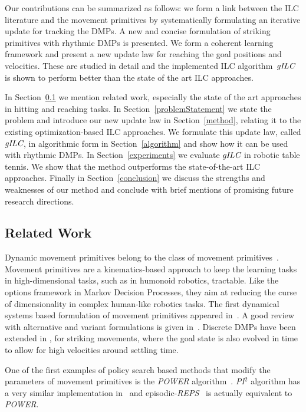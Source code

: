 Our contributions can be summarized as follows: we form a link between the ILC literature and the movement primitives by systematically formulating an iterative update for tracking the DMPs. A new and concise formulation of striking primitives with rhythmic DMPs is presented. We form a coherent learning framework and present a new update law for reaching the goal positions and velocities. These are studied in detail and the implemented ILC algorithm~$\emph{gILC}$ is shown to perform better than the state of the art ILC approaches.

In Section~\ref{relatedWork} we mention related work, especially the state of the art approaches in hitting and reaching tasks. In Section~\ref{problemStatement} we state the problem and introduce our new update law in Section~\ref{method}, relating it to the existing optimization-based ILC approaches. We formulate this update law, called $\emph{gILC}$, in algorithmic form in Section~\ref{algorithm} and show how it can be used with rhythmic DMPs. In Section~\ref{experiments} we evaluate $\emph{gILC}$ in robotic table tennis. We show that the method outperforms the state-of-the-art ILC approaches. Finally in Section~\ref{conclusion} we discuss the strengths and weaknesses of our method and conclude with brief mentions of promising future research directions.

\subsection{Related Work}\label{relatedWork}

Dynamic movement primitives belong to the class of movement primitives~\cite{Flash85}. Movement primitives are a kinematics-based approach to keep the learning tasks in high-dimensional tasks, such as in humonoid robotics, tractable. Like the options framework in Markov Decision Processes, they aim at reducing the curse of dimensionality in complex human-like robotics tasks. The first dynamical systems based formulation of movement primitives appeared in~\cite{Ijspeert02}. A good review with alternative and variant formulations is given in~\cite{Ijspeert13}. Discrete DMPs have been extended in \cite{Kober10}, \cite{Muelling13} for striking movements, where the goal state is also evolved in time to allow for high velocities around settling time.

One of the first examples of policy search based methods that modify the parameters of movement primitives is the \emph{POWER} algorithm~\cite{Kober08}. \emph{PI$^{2}$} algorithm has a very similar implementation in~\cite{Theodorou10} and episodic-\emph{REPS}~\cite{Peter10} is actually equivalent to \emph{POWER}.

